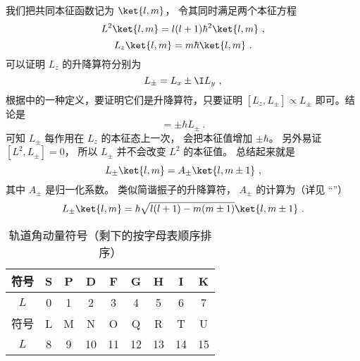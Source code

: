 我们把共同本征函数记为 $\ket{l,m}$， 令其同时满足两个本征方程
\begin{equation}
L^2\ket{l,m} = l(l+1)\hbar^2 \ket{l,m}~,
\end{equation}
\begin{equation}
L_z\ket{l,m} = m\hbar \ket{l,m}~.
\end{equation}
可以证明 $L_z$ 的升降算符分别为
\begin{equation}
L_\pm = L_x \pm \I L_y~,
\end{equation}
根据中的一种定义，要证明它们是升降算符，只要证明 $[L_z, L_\pm] \propto L_\pm$ 即可。结论是 %
\begin{equation}
[L_z, L_\pm] =  \pm \hbar L_ \pm~.
\end{equation}
可知 $L_\pm$ 每作用在 $L_z$ 的本征态上一次， 会把本征值增加 $\pm\hbar$。 另外易证 $[L^2, L_\pm] = 0$， 所以 $L_\pm$ 并不会改变 $L^2$ 的本征值。 总结起来就是
\begin{equation}
L_\pm \ket{l,m} = A_\pm \ket{l,m \pm 1}~,
\end{equation}
其中 $A_\pm$ 是归一化系数。 类似简谐振子的升降算符， $A_\pm$ 的计算为（详见 “”）
\begin{equation}
L_\pm \ket{l, m}  = \hbar \sqrt{l(l + 1) - m(m \pm 1)} \ket{l, m \pm 1} ~.
\end{equation}

\begin{table}[ht]
\centering
\caption{轨道角动量符号（剩下的按字母表顺序排序）}\label{tab_QOrbAM_1}
\begin{tabular}{|c|c|c|c|c|c|c|c|c|}
\hline
符号 & S & P & D & F & G & H & I & K\\
\hline
$L$ & 0 & 1 & 2 & 3 & 4 & 5 & 6 & 7\\
\hline
符号 & L & M & N & O & Q & R & T & U \\
\hline
$L$ & 8 & 9 & 10 & 11 & 12 & 13 & 14 & 15 \\
\hline
\end{tabular}
\end{table}
